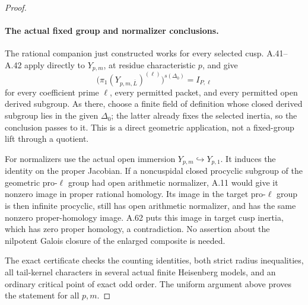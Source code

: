\begin{proof}
\paragraph{The actual fixed group and normalizer conclusions.}
The rational companion just constructed works for every
selected cusp. A.41--A.42 apply directly to \(Y_{p,m}\),
at residue characteristic \(p\), and give
\[
 \bigl(\pi_1(Y_{p,m,\overline L})^{(\ell)}\bigr)^{s(\Delta_0)}
                        =I_{P,\ell}                    \tag{A.63.14}
\]
for every coefficient prime \(\ell\), every permitted
packet, and every permitted open derived subgroup.
As there, choose a finite field of definition whose
closed derived subgroup lies in the given \(\Delta_0\);
the latter already fixes the selected inertia, so the
conclusion passes to it. This is a direct geometric
application, not a fixed-group lift through a quotient.

For normalizers use the actual open immersion
\(Y_{p,m}\hookrightarrow Y_{p,1}\). It induces the
identity on the proper Jacobian. If a noncuspidal closed
procyclic subgroup of the geometric pro-\(\ell\) group
had open arithmetic normalizer, A.11 would give it
nonzero image in proper rational homology. Its image in
the target pro-\(\ell\) group is then infinite
procyclic, still has open arithmetic normalizer, and has
the same nonzero proper-homology image. A.62 puts this
image in target cusp inertia, which has zero proper
homology, a contradiction. No assertion about the
nilpotent Galois closure of the enlarged composite is
needed.

The exact certificate 
checks the counting identities, both strict radius
inequalities, all tail-kernel characters in several
actual finite Heisenberg models, and an ordinary
critical point of exact odd order. The uniform argument
above proves the statement for all \(p,m\).
\end{proof}
